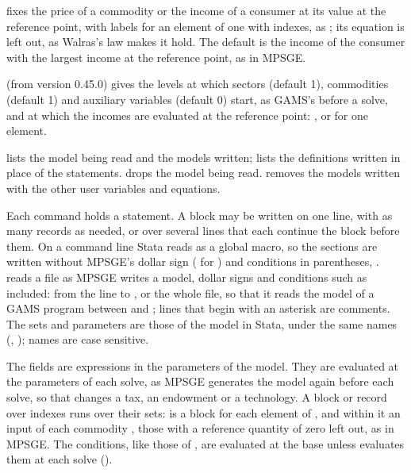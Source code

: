 \begin{optdesc}
\item[\optarg{num}{eraire}{name[(labels)]}] fixes the price of a commodity
or the income of a consumer at its value at the reference point, with
labels for an element of one with indexes, as ; its
equation is left out, as Walras's law makes it hold. The default is the
income of the consumer with the largest income at the reference point, as
in MPSGE.

\item[\optarg{st}{art}{levels}] (from version 0.45.0) gives the levels at
which sectors (default 1), commodities (default 1) and auxiliary variables
(default 0) start, as GAMS's  before a solve, and at which the
incomes are evaluated at the reference point: , or
 for one element.

\item[\opt{}{list}] lists the model being read and the models written;
 lists the definitions written in place of the statements.
 drops the model being read. 
removes the models written with the other user variables and equations.
\end{optdesc}



Each  command holds a statement. A block may be written on
one line, with as many records as needed, or over several lines that each
continue the block before them. On a command line Stata reads
\cmd{$} as a global macro, so the sections are written without
MPSGE's dollar sign ( for ) and conditions in
parentheses, .  reads a file as
MPSGE writes a model, dollar signs and conditions such as
 included: from the line  to ,
or the whole file, so that it reads the model of a GAMS program between
 and ; lines that begin with an asterisk are
comments. The sets and parameters are those of the model in Stata, under
the same names (, ); names are case
sensitive.

The fields are expressions in the parameters of the model. They are
evaluated at the parameters of each solve, as MPSGE generates the model
again before each solve, so that  changes a tax, an
endowment or a technology. A block or record over indexes runs over their
sets:  is a block for each element of , and
 within it an input of each commodity ,
those with a reference quantity of zero left out, as in MPSGE. The
conditions, like those of , are evaluated at the base
unless  evaluates them at each solve
().

